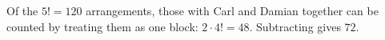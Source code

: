 Of the $5!=120$ arrangements, those with Carl and Damian together can be counted by treating them as one block: $2\cdot4!=48$. Subtracting gives $\boxed{72}$.
